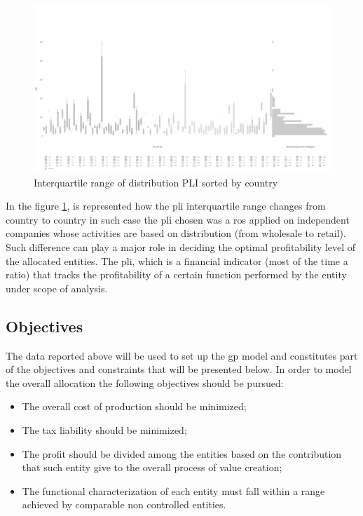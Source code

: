 \begin{doublespace}
\begin{figure}
\centering
\includegraphics[width=\textwidth]{Images/plidist1.png}
\caption{Interquartile range of distribution PLI sorted by country}
\label{fig:interquartile}
\end{figure}

In the figure \ref{fig:interquartile}, is represented how the \gls{pli} interquartile range changes from country to country in such case the \gls{pli} chosen was a \gls{ros} applied on independent companies whose activities are  based on distribution (from wholesale to retail). Such difference can play a major role in deciding the optimal profitability level of the allocated entities. The \gls{pli}, which is a financial indicator (most of the time a ratio) that tracks the profitability of a certain function performed by the entity under scope of analysis.

\subsection{Objectives}
The data reported above will be used to set up the \gls{gp} model and constitutes part of the objectives and constraints that will be presented below. In order to model the overall allocation the following objectives should be pursued:
\begin{itemize}
    \item The overall cost of production should be minimized;
    \item The tax liability should be minimized;
    \item The profit should be divided among the entities based on the contribution that such entity give to the overall process of value creation;
    \item The functional characterization of each entity must fall within a range achieved by comparable non controlled entities.
\end{itemize}


\end{doublespace}

